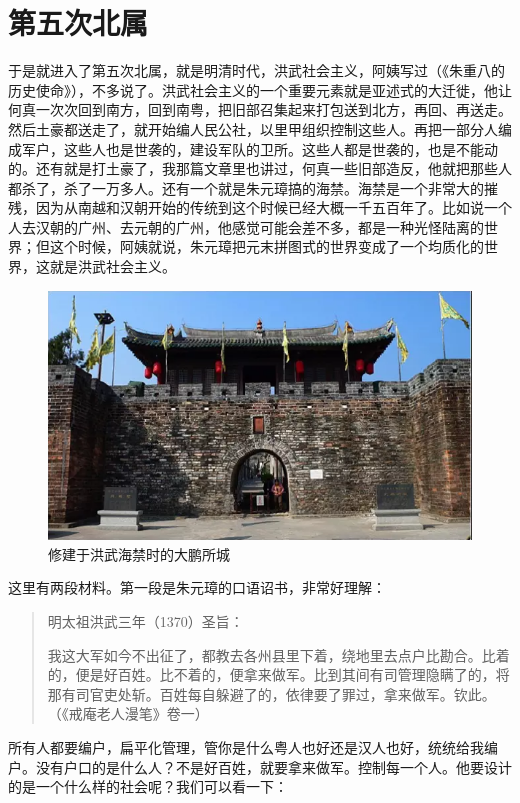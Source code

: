 \section{第五次北属}

于是就进入了第五次北属，就是明清时代，洪武社会主义，阿姨写过（《朱重八的历史使命》），不多说了。洪武社会主义的一个重要元素就是亚述式的大迁徙，他让何真一次次回到南方，回到南粤，把旧部召集起来打包送到北方，再回、再送走。然后土豪都送走了，就开始编人民公社，以里甲组织控制这些人。再把一部分人编成军户，这些人也是世袭的，建设军队的卫所。这些人都是世袭的，也是不能动的。还有就是打土豪了，我那篇文章里也讲过，何真一些旧部造反，他就把那些人都杀了，杀了一万多人。还有一个就是朱元璋搞的海禁。海禁是一个非常大的摧残，因为从南越和汉朝开始的传统到这个时候已经大概一千五百年了。比如说一个人去汉朝的广州、去元朝的广州，他感觉可能会差不多，都是一种光怪陆离的世界；但这个时候，阿姨就说，朱元璋把元末拼图式的世界变成了一个均质化的世界，这就是洪武社会主义。

\begin{figure}
	\centering
	\includegraphics[width=\textwidth]{images/image-45}
	\caption{修建于洪武海禁时的大鹏所城}
\end{figure}

这里有两段材料。第一段是朱元璋的口语诏书，非常好理解：

\begin{quote}
明太祖洪武三年（1370）圣旨：

我这大军如今不出征了，都教去各州县里下着，绕地里去点户比勘合。比着的，便是好百姓。比不着的，便拿来做军。比到其间有司管理隐瞒了的，将那有司官吏处斩。百姓每自躲避了的，依律要了罪过，拿来做军。钦此。（《戒庵老人漫笔》卷一）
\end{quote}

所有人都要编户，扁平化管理，管你是什么粤人也好还是汉人也好，统统给我编户。没有户口的是什么人？不是好百姓，就要拿来做军。控制每一个人。他要设计的是一个什么样的社会呢？我们可以看一下：

